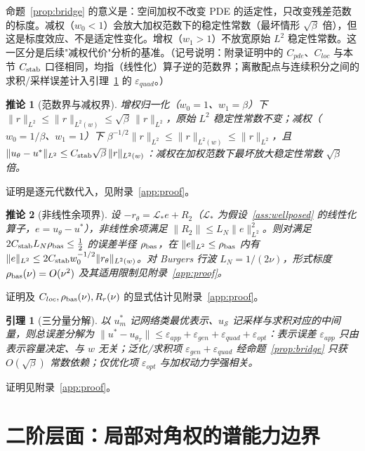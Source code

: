 \documentclass[fontset=windows,11pt]{ctexart}
\newcommand{\Lop}{\mathcal L}
\newtheorem{lemma}{引理}[section]
\newtheorem{corollary}{推论}[section]
\numberwithin{equation}{section}
\begin{document}
命题~\ref{prop:bridge} 的意义是：空间加权不改变 PDE 的适定性，只改变残差范数的标度。减权（$w_0<1$）会放大加权范数下的稳定性常数（最坏情形 $\sqrt{\beta}$ 倍），但这是标度效应、不是适定性变化。增权（$w_1>1$）不放宽原始 $L^2$ 稳定性常数。这一区分是后续"减权代价"分析的基准。（记号说明：附录证明中的 $C_{pde}$、$C_{loc}$ 与本节 $C_{\rm stab}$ 口径相同，均指（线性化）算子逆的范数界；离散配点与连续积分之间的求积/采样误差计入引理~\ref{lem:3comp} 的 $\varepsilon_{quad}$。）

\begin{corollary}[范数界与减权界]\label{cor:normbd}
增权归一化（$w_0=1$、$w_1=\beta$）下 $\|r\|_{L^2}\le\|r\|_{L^2(w)}\le\sqrt\beta\,\|r\|_{L^2}$，原始 $L^2$ 稳定性常数不变；减权（$w_0=1/\beta$、$w_1=1$）下 $\beta^{-1/2}\|r\|_{L^2}\le\|r\|_{L^2(w)}\le\|r\|_{L^2}$，且 $\|u_\theta-u^*\|_{L^2}\le C_{\rm stab}\sqrt\beta\,\|r\|_{L^2(w)}$：减权在加权范数下最坏放大稳定性常数 $\sqrt\beta$ 倍。
\end{corollary}
证明是逐元代数代入，见附录~\ref{app:proof}。

\begin{corollary}[非线性余项界]\label{cor:nonlin}
设 $-r_\theta=\Lop_*e+R_2$（$\Lop_*$ 为假设~\ref{ass:wellposed} 的线性化算子，$e=u_\theta-u^*$），非线性余项满足 $\|R_2\|\le L_N\|e\|_{L^2}^2$。则对满足 $2C_{\rm stab}L_N\rho_{\rm bas}\le\tfrac12$ 的误差半径 $\rho_{\rm bas}$，在 $\|e\|_{L^2}\le\rho_{\rm bas}$ 内有 $\|e\|_{L^2}\le 2C_{\rm stab}w_0^{-1/2}\|r_\theta\|_{L^2(w)}$。对 Burgers 行波 $L_N=1/(2\nu)$，形式标度 $\rho_{\rm bas}(\nu)=O(\nu^2)$ 及其适用限制见附录~\ref{app:proof}。
\end{corollary}
证明及 $C_{loc},\rho_{\rm bas}(\nu),R_r(\nu)$ 的显式估计见附录~\ref{app:proof}。

\begin{lemma}[三分量分解]\label{lem:3comp}
以 $u_m^*$ 记网络类最优表示、$u_{\mathcal S}$ 记采样与求积对应的中间量，则总误差分解为 $\|u^*-u_{\theta_T}\|\le\varepsilon_{app}+\varepsilon_{gen}+\varepsilon_{quad}+\varepsilon_{opt}$：表示误差 $\varepsilon_{app}$ 只由表示容量决定、与 $w$ 无关；泛化/求积项 $\varepsilon_{gen}+\varepsilon_{quad}$ 经命题~\ref{prop:bridge} 只获 $O(\sqrt\beta)$ 常数依赖；仅优化项 $\varepsilon_{opt}$ 与加权动力学强相关。
\end{lemma}
证明见附录~\ref{app:proof}。

\FloatBarrier

\section{二阶层面：局部对角权的谱能力边界}\label{sec:R}
\end{document}
